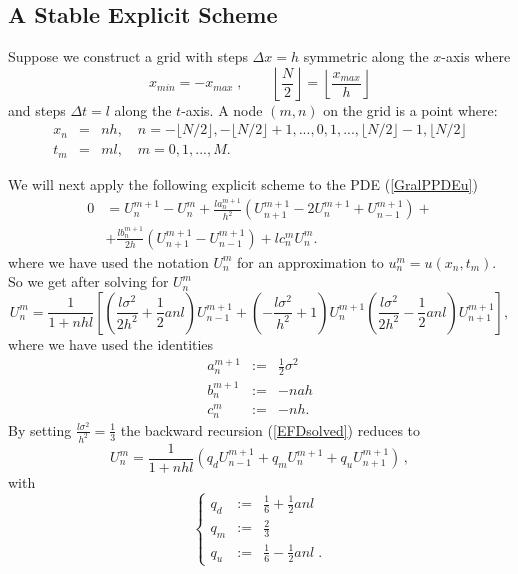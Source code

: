 \subsection{A Stable Explicit Scheme}
Suppose we construct a grid with steps $\Delta x = h$ symmetric along the
$x$-axis where
$$
x_{min} = -x_{max}\; , \qquad \left \lfloor \frac{N}{2} \right \rfloor  =
\left \lfloor \frac{x_{max} }{h} \right \rfloor
$$
and steps $\Delta t = l$ along the $t$-axis. A node $(m,n)$ on the
grid is a point where: 
\begin{eqnarray}
x_n & = & n h, \quad n = -\lfloor N/2 \rfloor, -\lfloor N/2 \rfloor
+1, ..., 0, 1, ..., \lfloor N/2 \rfloor -1, \lfloor N/2 \rfloor\\ 
t_m & = & m l, \quad m = 0, 1, ..., M.
\end{eqnarray}

We will next apply the following explicit scheme to the PDE
(\ref{GralPPDEu}) 
\begin{equation}
\label{EFD}
\begin{split}
0 & = U^{m+1}_n-U^m_n + \frac{ l
  a^{m+1}_n}{h^2}(U^{m+1}_{n+1}-2U^{m+1}_n+U^{m+1}_{n-1})+\\  
  & + \frac{ l b^{m+1}_n}{2h}(U^{m+1}_{n+1}-U^{m+1}_{n-1}) + l c^m_n U^m_n. 
\end{split}
\end{equation}
where we have used the notation $U^m_n$ for an approximation to $u^m_n
= u(x_n , t_m)$. So we get after solving for $U^m_n$ 
\begin{equation}
\label{EFDsolved}
U^m_n = \frac{1}{1+n h l} \left[ \left(\frac{l \sigma^2}{2 h^2} +
    \frac{1}{2} a n l\right) U^{m+1}_{n-1} + \left( -
    \frac{l\sigma^2}{h^2} + 1\right) U^{m+1}_n \left( \frac{l
      \sigma^2}{2 h^2} - \frac{1}{2} a n l \right)U^{m+1}_{n+1} \right],
\end{equation}
where we have used the identities
\begin{eqnarray}
\label{idcoef}
\nonumber
a^{m+1}_n & := & \frac{1}{2} \sigma^2\\
b^{m+1}_n & := & -n a h \\ 
\nonumber
c^m_n & := & -n h.
\end{eqnarray}
By setting $\frac{l \sigma^2}{h^2}=\frac{1}{3}$ the backward recursion 
(\ref{EFDsolved}) reduces to
\begin{equation}
\label{EFDcondensed}
U^m_n = \frac{1}{1+ nhl } \left( q_d U^{m+1}_{n-1} + q_m U^{m+1}_n +
  q_u U^{m+1}_{n+1} \right)\, ,
\end{equation} 
with 
\begin{equation}
\left\{
\begin{array}{rcl}
\nonumber
q_d & := & \frac{1}{6} + \frac{1}{2} a n l \\
\nonumber
q_m & := & \frac{2}{3} \\
\nonumber
q_u  & := & \frac{1}{6} - \frac{1}{2} a n l\; .
\end{array}
\right. 
\end{equation}

